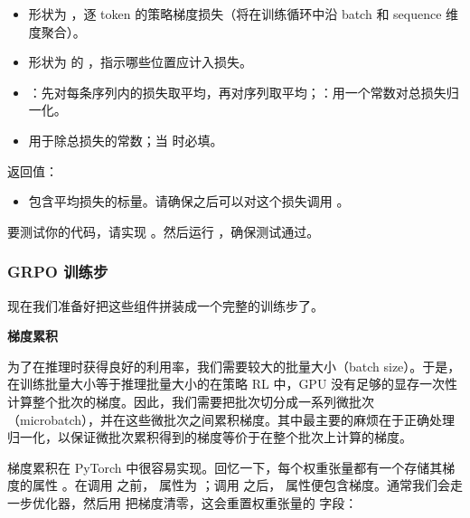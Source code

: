 \begin{itemize}
  \item {} 形状为 ，逐 token 的策略梯度损失（将在训练循环中沿 batch 和 sequence 维度聚合）。
  \item {} 形状为  的 ，指示哪些位置应计入损失。
  \item {} ：先对每条序列内的损失取平均，再对序列取平均；：用一个常数对总损失归一化。
  \item {} 用于除总损失的常数；当  时必填。
\end{itemize}

返回值：

\begin{itemize}
  \item {} 包含平均损失的标量。请确保之后可以对这个损失调用 。
\end{itemize}

要测试你的代码，请实现 。然后运行 ，确保测试通过。

\subsubsection{GRPO 训练步}

现在我们准备好把这些组件拼装成一个完整的训练步了。

\medskip
\noindent\textbf{梯度累积}\par\medskip

为了在推理时获得良好的利用率，我们需要较大的批量大小（batch size）。于是，在训练批量大小等于推理批量大小的在策略 RL 中，GPU 没有足够的显存一次性计算整个批次的梯度。因此，我们需要把批次切分成一系列微批次（microbatch），并在这些微批次之间累积梯度。其中最主要的麻烦在于正确处理归一化，以保证微批次累积得到的梯度等价于在整个批次上计算的梯度。

梯度累积在 PyTorch 中很容易实现。回忆一下，每个权重张量都有一个存储其梯度的属性 。在调用  之前， 属性为 ；调用  之后， 属性便包含梯度。通常我们会走一步优化器，然后用  把梯度清零，这会重置权重张量的  字段：

